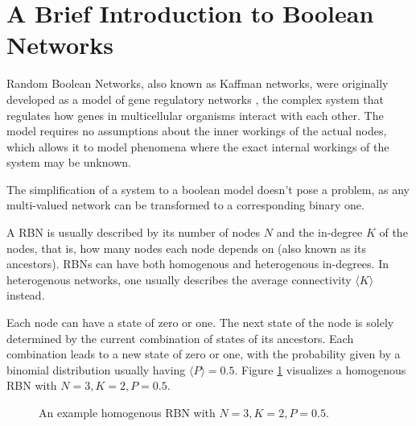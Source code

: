 
\section{A Brief Introduction to Boolean Networks}
\label{section:rbns}

Random Boolean Networks, also known as Kaffman networks,
were originally developed as a model of gene regulatory networks \cite{kauffman1969metabolic},
the complex system that regulates how genes in multicellular organisms interact with each other.
The model requires no assumptions about the inner workings of the actual nodes,
which allows it to model phenomena where the exact internal workings of the system may be unknown.

The simplification of a system to a boolean model doesn't pose a problem,
as any multi-valued network can be transformed to a corresponding binary one.

A RBN is usually described by its number of nodes $N$ and the in-degree $K$ of the nodes,
that is, how many nodes each node depends on (also known as its ancestors).
RBNs can have both homogenous and heterogenous in-degrees.
In heterogenous networks, one usually describes the average connectivity $\langle K \rangle$ instead.

Each node can have a state of zero or one.
The next state of the node is solely determined by the current combination of states of its ancestors.
Each combination leads to a new state of zero or one,
with the probability given by a binomial distribution usually having $\langle P \rangle = 0.5$.
Figure \ref{figure:sample-homogenous-rbn} visualizes a homogenous RBN with $N=3, K=2, P=0.5$.

\begin{figure}
  \centering
  \caption{An example homogenous RBN with $N=3, K=2, P=0.5$.}
  \label{figure:sample-homogenous-rbn}
\end{figure}

